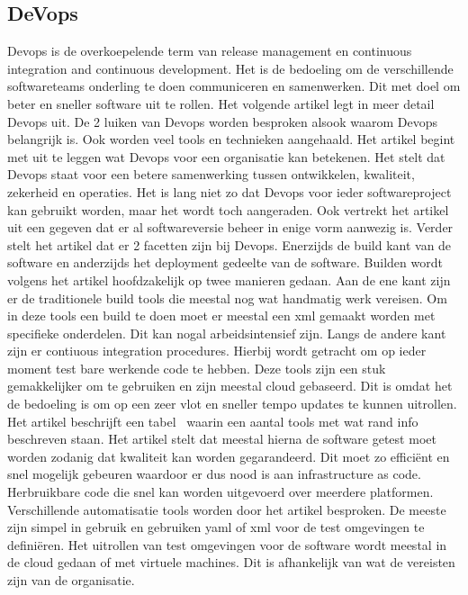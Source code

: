 \subsection{DeVops}
Devops is de overkoepelende term van release management en continuous integration and continuous development. Het is de bedoeling om de verschillende softwareteams onderling te doen communiceren en samenwerken. Dit met doel om beter en sneller software uit te rollen. Het volgende artikel \autocite{Ebert2016} legt in meer detail Devops uit. De 2 luiken van Devops worden besproken alsook waarom Devops belangrijk is. Ook worden veel tools en technieken aangehaald.
\newline
\newline
Het artikel \autocite{Ebert2016} begint met uit te leggen wat Devops voor een organisatie kan betekenen. Het stelt dat Devops staat voor een betere samenwerking tussen ontwikkelen, kwaliteit, zekerheid en operaties. Het is lang niet zo dat Devops voor ieder softwareproject kan gebruikt worden, maar het wordt toch aangeraden. Ook vertrekt het artikel uit een gegeven dat er al softwareversie beheer in enige vorm aanwezig is.
\newline
\newline
Verder stelt het artikel \autocite{Ebert2016} dat er 2 facetten zijn bij Devops. Enerzijds de build kant van de software en anderzijds het deployment gedeelte van de software. Builden wordt volgens het artikel hoofdzakelijk op twee manieren gedaan. Aan de ene kant zijn er de traditionele build tools die meestal nog wat handmatig werk vereisen. Om in deze tools een build te doen moet er meestal een xml gemaakt worden met specifieke onderdelen. Dit kan nogal arbeidsintensief zijn. Langs de andere kant zijn er contiuous integration procedures. Hierbij wordt getracht om op ieder moment test bare werkende code te hebben. Deze tools zijn een stuk gemakkelijker om te gebruiken en zijn meestal cloud gebaseerd. Dit is omdat het de bedoeling is om op een zeer vlot en sneller tempo updates te kunnen uitrollen. Het artikel beschrijft een tabel~\textcite{Ebert2016} waarin een aantal tools met wat rand info beschreven staan.
\newline
\newline
Het artikel \autocite{Ebert2016} stelt dat meestal hierna de software getest moet worden zodanig dat kwaliteit kan worden gegarandeerd. Dit moet zo efficiënt en snel mogelijk gebeuren waardoor er dus nood is aan infrastructure as code. Herbruikbare code die snel kan worden uitgevoerd over meerdere platformen. Verschillende automatisatie tools worden door het artikel besproken. De meeste zijn simpel in gebruik en gebruiken yaml of xml voor de test omgevingen te definiëren. Het uitrollen van test omgevingen voor de software wordt meestal in de cloud gedaan of met virtuele machines. Dit is afhankelijk van wat de vereisten zijn van de organisatie. 
